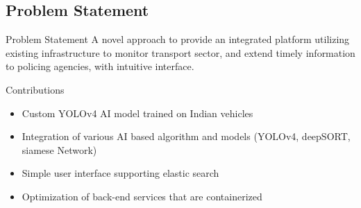 \documentclass{beamer}
\begin{document}

	\subsection{Problem Statement}
	\begin{frame}{Problem Statement}
		A novel approach to provide an integrated platform utilizing existing infrastructure to monitor transport sector, and extend timely information to policing agencies, with intuitive interface.
	\end{frame}

	\begin{frame}{Contributions}
		\begin{itemize}
			\item Custom YOLOv4 AI model trained on Indian vehicles
			\item Integration of various AI based algorithm and models (YOLOv4, deepSORT, siamese Network)
			\item Simple user interface supporting elastic search
			\item Optimization of back-end services that are containerized 
		\end{itemize}
	\end{frame}
	
	
	
\end{document}
